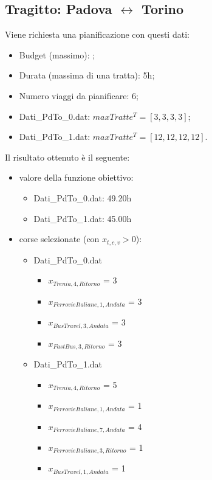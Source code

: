 \documentclass[main.tex]{subfiles}
\begin{document}
\subsection*{Tragitto: Padova $\leftrightarrow$ Torino}
Viene richiesta una pianificazione con questi dati:
\begin{itemize}
    \item Budget (massimo): ;
    \item Durata (massima di una tratta): 5h;
    \item Numero viaggi da pianificare: 6;
    \item Dati\_PdTo\_0.dat: $maxTratte^T = [3,3,3,3]$;
    \item Dati\_PdTo\_1.dat: $maxTratte^T = [12,12,12,12]$.
\end{itemize}
Il risultato ottenuto è il seguente:
\begin{itemize}
    \item valore della funzione obiettivo:
    \begin{itemize}
        \item Dati\_PdTo\_0.dat: 49.20h
        \item Dati\_PdTo\_1.dat: 45.00h
    \end{itemize}
    \item corse selezionate (con $x_{t,c,v} > 0$):
    \begin{itemize}
        \item Dati\_PdTo\_0.dat
        \begin{itemize}
            \item $x_{Trenia,4,Ritorno}$ = 3
            \item $x_{FerrovieItaliane,1,Andata}$ = 3
            \item $x_{BusTravel,3,Andata}$ = 3
            \item $x_{FastBus,3,Ritorno}$ = 3
        \end{itemize}
        \item Dati\_PdTo\_1.dat
        \begin{itemize}
            \item $x_{Trenia,4,Ritorno}$ = 5
            \item $x_{FerrovieItaliane,1,Andata}$ = 1
            \item $x_{FerrovieItaliane,7,Andata}$ = 4
            \item $x_{FerrovieItaliane,3,Ritorno}$ = 1
            \item $x_{BusTravel,1,Andata}$ = 1
        \end{itemize}

\end{itemize}
\end{itemize}
\end{document}
